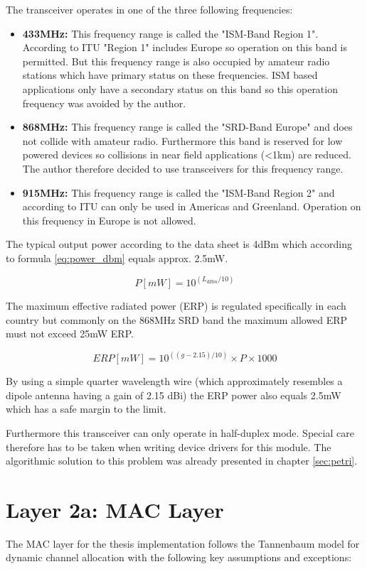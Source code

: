 The transceiver operates in one of the three following frequencies:
\begin{itemize}
    \item \textbf{433MHz:} This frequency range is called the "ISM-Band Region 1". According to ITU "Region 1" includes Europe so operation on this band is permitted. But this frequency range is also occupied by amateur radio stations which have primary status on these frequencies. ISM based applications only have a secondary status on this band so this operation frequency was avoided by the author.
    \item \textbf{868MHz:} This frequency range is called the "SRD-Band Europe" and does not collide with amateur radio. Furthermore this band is reserved for low powered devices so collisions in near field applications (<1km) are reduced. The author therefore decided to use transceivers for this frequency range.
    \item \textbf{915MHz:} This frequency range is called the "ISM-Band Region 2" and according to ITU can only be used in Americas and Greenland. Operation on this frequency in Europe is not allowed.
\end{itemize}

The typical output power according to the data sheet is 4dBm which according to formula \ref{eq:power_dbm} equals approx. 2.5mW.

\begin{equation}
\label{eq:power_dbm}
P[mW] = 10^{(L_{dBm}/10)}
\end{equation}

The maximum effective radiated power (ERP) is regulated specifically in each country but commonly on the 868MHz SRD band the maximum allowed ERP must not exceed 25mW ERP.

\begin{equation}
ERP[mW] = 10^{((g-2.15)/10)} \times P \times 1000
\label{eq:power_dbm}
\end{equation}

By using a simple quarter wavelength wire (which approximately resembles a dipole antenna having a gain of 2.15 dBi) the ERP power also equals 2.5mW which has a safe margin to the limit.

Furthermore this transceiver can only operate in half-duplex mode. Special care therefore has to be taken when writing device drivers for this module. The algorithmic solution to this problem was already presented in chapter \ref{sec:petri}.

\section{Layer 2a: MAC Layer}%
The MAC layer for the thesis implementation follows the Tannenbaum \cite{tannenbaum} model for dynamic channel allocation with the following key assumptions and exceptions:

